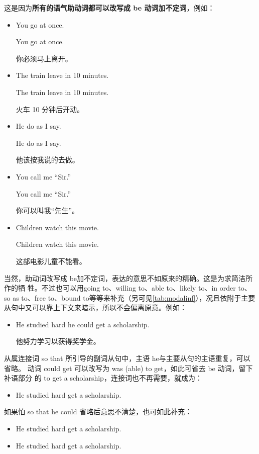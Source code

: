 这是因为\textbf{所有的语气助动词都可以改写成 be 动词加不定词}，例如：
\begin{itemize}
\item   You  go at once.

  \reitem You  go at once.

  你必须马上离开。
\item The train  leave in 10 minutes.

\reitem The train  leave in 10 minutes.

火车 10 分钟后开动。

\item   He  do as I say.

  \reitem He  do as I say.

  他该按我说的去做。

\item   You  call me “Sir.”

  \reitem You  call me “Sir.”

  你可以叫我“先生”。

\item Children  watch this movie.

  \reitem Children  watch this movie.

  这部电影儿童不能看。
\end{itemize}

当然，助动词改写成 be加不定词，表达的意思不如原来的精确。这是为求简洁所作的牺
牲。不过也可以用going to、willing to、able to、likely to、in order to、so as
to、free to、bound to等等来补充（另可见\cref{tab:modalinf}），况且依附于主要
从句中又可以靠上下文来暗示，所以不会偏离原意。例如：

\begin{itemize}
\item He studied hard  he could get a scholarship.

  他努力学习以获得奖学金。
\end{itemize}
从属连接词 so that 所引导的副词从句中，主语 he与主要从句的主语重复，可以省略。
动词 could get 可以改写为 was (able) to get，如此可省去 be 动词，留下补语部分
的 to get a scholarship，连接词也不再需要，就成为：
\begin{itemize}
\item He studied hard  get a scholarship.
\end{itemize}
如果怕 so that he could 省略后意思不清楚，也可如此补充：
\begin{itemize}
\item   He studied hard  get a scholarship.
\item   He studied hard  get a scholarship.
\end{itemize}

